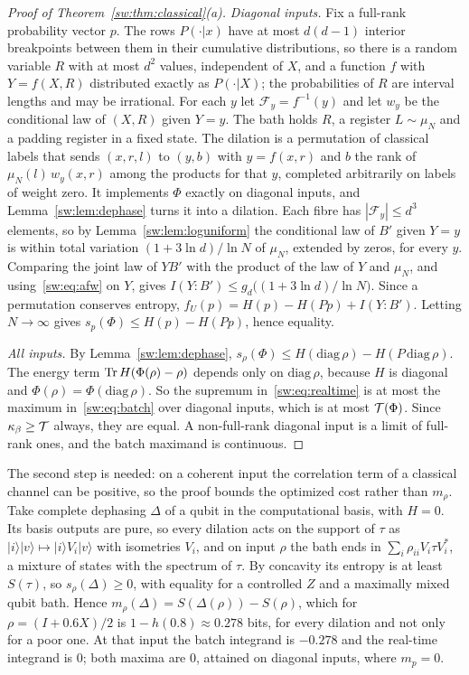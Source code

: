 \begin{proof}[Proof of Theorem~\ref{sw:thm:classical}(a)]
\emph{Diagonal inputs.} Fix a full-rank probability vector $p$. The rows $P(\cdot|x)$ have at most $d(d-1)$ interior breakpoints between them in their cumulative distributions, so there is a random variable $R$ with at most $d^2$ values, independent of $X$, and a function $f$ with $Y=f(X,R)$ distributed exactly as $P(\cdot|X)$; the probabilities of $R$ are interval lengths and may be irrational. For each $y$ let $\mathcal F_y=f^{-1}(y)$ and let $w_y$ be the conditional law of $(X,R)$ given $Y=y$. The bath holds $R$, a register $L\sim\mu_N$ and a padding register in a fixed state. The dilation is a permutation of classical labels that sends $(x,r,l)$ to $(y,b)$ with $y=f(x,r)$ and $b$ the rank of $\mu_N(l)\,w_y(x,r)$ among the products for that $y$, completed arbitrarily on labels of weight zero. It implements $\Phi$ exactly on diagonal inputs, and Lemma~\ref{sw:lem:dephase} turns it into a dilation. Each fibre has $|\mathcal F_y|\le d^3$ elements, so by Lemma~\ref{sw:lem:loguniform} the conditional law of $B'$ given $Y=y$ is within total variation $(1+3\ln d)/\ln N$ of $\mu_N$, extended by zeros, for every $y$. Comparing the joint law of $YB'$ with the product of the law of $Y$ and $\mu_N$, and using~\eqref{sw:eq:afw} on $Y$, gives $I(Y{:}B')\le g_d\bigl((1+3\ln d)/\ln N\bigr)$. Since a permutation conserves entropy, $f_U(p)=H(p)-H(Pp)+I(Y{:}B')$. Letting $N\to\infty$ gives $s_p(\Phi)\le H(p)-H(Pp)$, hence equality.

\emph{All inputs.} By Lemma~\ref{sw:lem:dephase}, $s_\rho(\Phi)\le H(\mathrm{diag}\,\rho)-H(P\,\mathrm{diag}\,\rho)$. The energy term $\operatorname{Tr} H(\Phi(\rho)-\rho)$ depends only on $\mathrm{diag}\,\rho$, because $H$ is diagonal and $\Phi(\rho)=\Phi(\mathrm{diag}\,\rho)$. So the supremum in~\eqref{sw:eq:realtime} is at most the maximum in~\eqref{sw:eq:batch} over diagonal inputs, which is at most $\mathcal T(\Phi)$. Since $\kappa_\beta\ge\mathcal T$ always, they are equal. A non-full-rank diagonal input is a limit of full-rank ones, and the batch maximand is continuous.
\end{proof}

The second step is needed: on a coherent input the correlation term of a classical channel can be positive, so the proof bounds the optimized cost rather than $m_\rho$. Take complete dephasing $\Delta$ of a qubit in the computational basis, with $H=0$. Its basis outputs are pure, so every dilation acts on the support of $\tau$ as $|i\rangle|v\rangle\mapsto|i\rangle V_i|v\rangle$ with isometries $V_i$, and on input $\rho$ the bath ends in $\sum_i\rho_{ii}V_i\tau V_i^*$, a mixture of states with the spectrum of $\tau$. By concavity its entropy is at least $S(\tau)$, so $s_\rho(\Delta)\ge0$, with equality for a controlled $Z$ and a maximally mixed qubit bath. Hence $m_\rho(\Delta)=S(\Delta(\rho))-S(\rho)$, which for $\rho=(I+0.6X)/2$ is $1-h(0.8)\approx0.278$ bits, for every dilation and not only for a poor one. At that input the batch integrand is $-0.278$ and the real-time integrand is $0$; both maxima are $0$, attained on diagonal inputs, where $m_p=0$.

